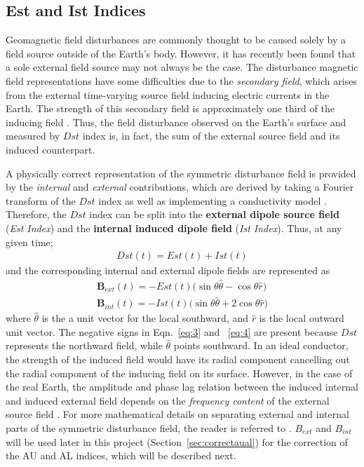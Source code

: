 \documentclass[12pt]{report} %
\begin{document}
\vspace{-10pt}
\subsection{Est and Ist Indices} \label{sec:estist}
\vspace{-5pt}
 Geomagnetic field disturbances are commonly thought to be caused solely by a field source outside of the Earth's body. However, it has recently been found that a sole external field source may not always be the case. The disturbance magnetic field representations have some difficulties due to the \emph{secondary field}, which arises from the external time-varying source field inducing electric currents in the Earth. The strength of this secondary field is approximately one third of the inducing field \citep{maus04}. Thus, the field disturbance observed on the Earth's surface and measured by $Dst$ index is, in fact, the sum of the external source field and its induced counterpart. 
 
 A physically correct representation of the symmetric disturbance field is provided by the \emph{internal} and \emph{external} contributions, which are derived by taking a Fourier transform of the $Dst$ index as well as implementing a conductivity model \citep{utada03}. Therefore, the $Dst$ index can be split into the {\bfseries external dipole source field} (\emph{Est Index}) and the {\bfseries internal induced dipole field} (\emph{Ist Index}). Thus, at any given time;
\begin{align}
Dst (t) = Est (t) + Ist (t) \label{eq:2}
\end{align}
\noindent and the corresponding internal and external dipole fields are represented as
\begin{align}
\mathbf{B}_{ext} (t) = - Est(t) \Big (\sin \theta \hat{\theta} - \cos \theta \hat{r}\Big ) \label{eq:3} \\
\mathbf{B}_{int} (t) = - Ist(t) \Big ( \sin \theta \hat{\theta} + 2 \cos \theta \hat{r}\Big ) \label{eq:4} 
\end{align}
\noindent where $\hat{\theta}$ is the a unit vector for the local southward, and $\hat{r}$ is the local outward unit vector. The negative signs in Eqn.~\ref{eq:3} and ~\ref{eq:4} are present because $Dst$ represents the northward field, while $\hat{\theta}$ points southward. In an ideal conductor, the strength of the induced field would have its radial component cancelling out the radial component of the inducing field on its surface. However, in the case of the real Earth, the amplitude and phase lag relation between the induced internal and induced external field depends on the \emph{frequency content} of the external source field \citep{maus04}. For more mathematical details on separating external and internal parts of the symmetric disturbance field, the reader is referred to \cite{maus04}. $B_{ext}$ and $B_{int}$ will be used later in this project (Section~\ref{sec:correctaual}) for the correction of the AU and AL indices, which will be described next.
\vspace{-10pt}
\end{document}

